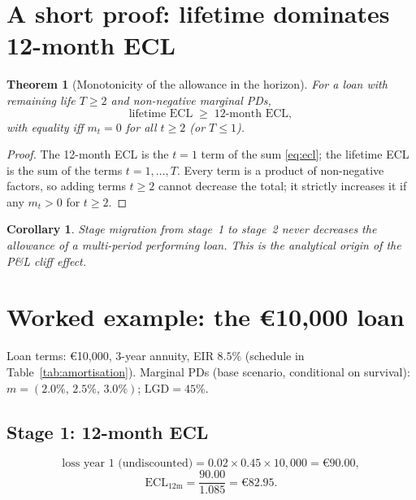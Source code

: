\documentclass[11pt,a4paper]{report}
\renewcommand{\EUR}[1]{\euro#1}
\theoremstyle{definition}
\theoremstyle{plain}
\newtheorem{theorem}[definition]{Theorem}
\newtheorem{corollary}[definition]{Corollary}
\newcommand{\LGD}{\mathrm{LGD}}
\newcommand{\ECL}{\mathrm{ECL}}
\begin{document}
\section{A short proof: lifetime dominates 12-month ECL}

\begin{theorem}[Monotonicity of the allowance in the horizon]
\label{thm:lt}
For a loan with remaining life $T\ge 2$ and non-negative marginal PDs,
\begin{equation}
  \text{lifetime ECL} \;\ge\; \text{12-month ECL},
\end{equation}
with equality iff $m_t=0$ for all $t\ge 2$ (or $T\le 1$).
\end{theorem}

\begin{proof}
The 12-month ECL is the $t=1$ term of the sum \eqref{eq:ecl}; the
lifetime ECL is the sum of the terms $t=1,\dots,T$. Every term is a
product of non-negative factors, so adding terms $t\ge 2$ cannot
decrease the total; it strictly increases it if any $m_t>0$ for
$t\ge 2$.
\end{proof}

\begin{corollary}
Stage migration from stage~1 to stage~2 never decreases the allowance
of a multi-period performing loan. This is the analytical origin of
the P\&L cliff effect.
\end{corollary}

\section{Worked example: the \texorpdfstring{\EUR{10{,}000}}{10000} loan}

Loan terms: \EUR{10{,}000}, 3-year annuity, EIR $8.5\%$ (schedule in
Table~\ref{tab:amortisation}). Marginal PDs (base scenario,
conditional on survival): $m=(2.0\%,\,2.5\%,\,3.0\%)$;
$\LGD=45\%$.

\subsection{Stage 1: 12-month ECL}

\begin{equation}
  \text{loss year 1 (undiscounted)}=0.02\times0.45\times10{,}000
  =\EUR{90.00},
\end{equation}
\begin{equation}
  \ECL_{12\text{m}}=\frac{90.00}{1.085}=\EUR{82.95}.
\end{equation}
\end{document}
